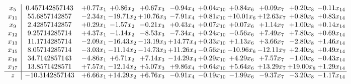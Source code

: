 \documentclass[9pt]{article}
\begin{document}
\[\begin{array}{c| c c@{\hskip 2pt} c@{\hskip 2pt} c@{\hskip 2pt} c@{\hskip 2pt} c@{\hskip 2pt} c@{\hskip 2pt} c@{\hskip 2pt} c@{\hskip 2pt} c@{\hskip 2pt} }
 x_{5}   &  0.457142857143 & +  0.77 x_{1} & +  0.86 x_{2} & +  0.67 x_{3} & -0.94 x_{4} & +  0.04 x_{10} & +  0.84 x_{6} & +  0.09 x_{7} & +  0.20 x_{8} & -0.11 x_{14}\\
 x_{11}   &  55.6857142857 & -2.34 x_{1} & -19.71 x_{2} & + 10.76 x_{3} & -7.91 x_{4} & +  0.81 x_{10} & + 10.01 x_{6} & + 12.63 x_{7} & +  0.80 x_{8} & +  0.83 x_{14}\\
 x_{9}   &  2.42857142857 & +  0.29 x_{1} & -1.57 x_{2} & -0.21 x_{3} & +  0.43 x_{4} & +  0.07 x_{10} & +  0.07 x_{6} & +  1.14 x_{7} & +  1.00 x_{8} & +  0.14 x_{14}\\
 x_{12}   &  9.25714285714 & +  4.37 x_{1} & -1.14 x_{2} & -8.53 x_{3} & -7.34 x_{4} & +  0.24 x_{10} & -0.56 x_{6} & +  7.49 x_{7} & +  7.80 x_{8} & +  0.69 x_{14}\\
 x_{13}   &  11.1714285714 & -2.09 x_{1} & -16.43 x_{2} & -13.19 x_{3} & + 14.77 x_{4} & +  0.33 x_{10} & +  1.13 x_{6} & +  3.66 x_{7} & -2.80 x_{8} & +  1.46 x_{14}\\
 x_{15}   &  8.05714285714 & -3.03 x_{1} & -11.14 x_{2} & -14.73 x_{3} & + 11.26 x_{4} & -0.56 x_{10} & -10.96 x_{6} & -12.11 x_{7} & +  2.40 x_{8} & +  0.49 x_{14}\\
 x_{16}   &  34.7142857143 & -4.86 x_{1} & +  6.71 x_{2} & +  7.14 x_{3} & -14.29 x_{4} & +  0.29 x_{10} & +  4.29 x_{6} & +  7.57 x_{7} & -1.00 x_{8} & -0.43 x_{14}\\
 x_{17}   &  13.8571428571 & +  7.57 x_{1} & -12.14 x_{2} & +  5.07 x_{3} & +  9.86 x_{4} & +  0.64 x_{10} & +  5.64 x_{6} & + 13.29 x_{7} & + 19.00 x_{8} & +  1.29 x_{14}\\
\hline
z    &  -10.3142857143 & +  6.66 x_{1} & + 14.29 x_{2} & +  6.76 x_{3} & -0.91 x_{4} & -0.19 x_{10} & -1.99 x_{6} & -9.37 x_{7} & -3.20 x_{8} & -1.17 x_{14}\\
\end{array}\]
\end{document}
